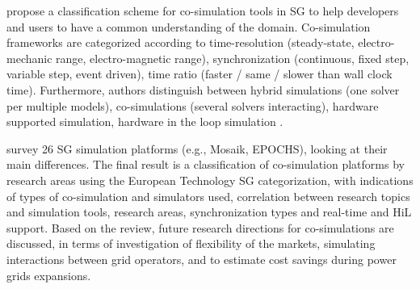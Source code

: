 \documentclass[1p]{elsarticle} %
\begin{document}
\citet{ref:schloegl2015towards} propose a classification scheme for co-simulation tools in SG to help developers and users to have a common understanding of the domain. Co-simulation frameworks are categorized according to time-resolution (steady-state, electro-mechanic range, electro-magnetic range), synchronization (continuous, fixed step, variable step, event driven), time ratio (faster / same / slower than wall clock time). Furthermore, authors distinguish between hybrid simulations (one solver per multiple models), co-simulations (several solvers interacting), hardware supported simulation, hardware in the loop simulation \citep{ref:schloegl2015towards}. 


\citet{ref:vogt2018survey} survey 26 SG simulation platforms (e.g., Mosaik, EPOCHS), looking at their main differences.  The final result is a classification of co-simulation platforms by research areas using the European Technology SG categorization, with indications of types of co-simulation and simulators used, correlation between research topics and simulation tools, research areas, synchronization types and real-time and HiL support. Based on the review, future research directions for co-simulations are discussed, in terms of investigation of flexibility of the markets, simulating interactions between grid operators, and to estimate cost savings during power grids expansions.
\end{document}
